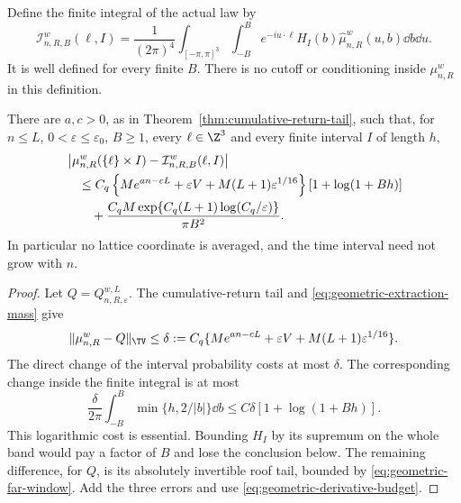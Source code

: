 Define the finite integral of the actual law by
\begin{equation}\label{eq:actual-microscopic-finite-integral}
 \mathcal I_{n,R,B}^{w}(\ell,I)
 =\frac1{(2\pi)^4}\int_{[-\pi,\pi]^3}\int_{-B}^{B}
    e^{-iu\cdot\ell}H_I(b)\widehat\mu_{n,R}^w(u,b)\dd b\dd u.
\end{equation}
It is well defined for every finite $B$. There is no cutoff or
conditioning inside $\mu_{n,R}^w$ in this definition.

\begin{theorem}
\label{thm:microscopic-finite-band-reduction}
There are $a,c>0$, as in Theorem~\ref{thm:cumulative-return-tail}, such
that, for $n\le L$, $0<\varepsilon\le\varepsilon_0$, $B\ge1$, every
$\ell\in\Z^3$ and every finite interval $I$ of length $h$,
\begin{align}
 &\left|\mu_{n,R}^w(\{\ell\}\times I)
                    -\mathcal I_{n,R,B}^{w}(\ell,I)\right|\notag\\
 &\quad\le C_q\left\{M e^{an-cL}+\varepsilon V
                    +M(L+1)\varepsilon^{1/16}\right\}
                         [1+\log(1+Bh)]\notag\\
 &\qquad+\frac{C_qM\exp\{C_q(L+1)\log(C_q/\varepsilon)\}}{\pi B^2}.
                 \label{eq:microscopic-finite-band-error}
\end{align}
In particular no lattice coordinate is averaged, and the time interval
need not grow with $n$.
\end{theorem}
\begin{proof}
Let $Q=Q_{n,R,\varepsilon}^{w,L}$. The cumulative-return tail and
\eqref{eq:geometric-extraction-mass} give
\begin{equation}\label{eq:full-law-geometric-TV}
 \|\mu_{n,R}^w-Q\|_{\TV}
 \le \delta:=C_q\{M e^{an-cL}+\varepsilon V
                         +M(L+1)\varepsilon^{1/16}\}.
\end{equation}
The direct change of the interval probability costs at most $\delta$.
The corresponding change inside the finite integral is at most
\[
 \frac{\delta}{2\pi}\int_{-B}^B\min\{h,2/|b|\}\dd b
       \le C\delta[1+\log(1+Bh)].
\]
This logarithmic cost is essential. Bounding $H_I$ by its supremum on
the whole band would pay a factor of $B$ and lose the conclusion below.
The remaining difference, for $Q$, is its absolutely invertible roof
tail, bounded by \eqref{eq:geometric-far-window}. Add the three errors
and use \eqref{eq:geometric-derivative-budget}.
\end{proof}

